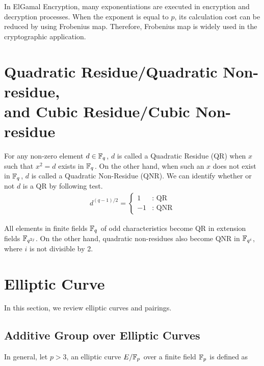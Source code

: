 In ElGamal Encryption, many exponentiations are executed in encryption and decryption processes.
When the exponent is equal to $p$, its calculation cost can be reduced by using Frobenius map.
Therefore, Frobenius map is widely used in the cryptographic application.     

\section{Quadratic Residue/Quadratic Non-residue, \\and Cubic Residue/Cubic Non-residue}
\label{sec:chap:fund:qrqnr}

For any non-zero element $d\in{\mathbb{F}}_{q^{}}$, $d$ is called a Quadratic Residue (QR) when $x$ such that $x^2=d$ exists in ${\mathbb{F}}_{q^{}}$.
On the other hand, when such an $x$ does not exist in ${\mathbb{F}}_{q^{}}$, $d$ is called a Quadratic Non-Residue (QNR).
We can identify whether or not $d$ is a QR by following test.
\begin{eqnarray}
d^{(q-1)/2} = \left\{
\begin{array}{ll}
1 & \mbox{: QR} \\
-1 & \mbox{: QNR} 
\end{array}
\right.
\end{eqnarray}

All elements in finite fields ${\mathbb{F}}_{q^{}}$ of odd characteristics become QR in extension fields ${\mathbb{F}}_{q^{2j}}$.
On the other hand, quadratic non-residues also become QNR in ${\mathbb{F}}_{q^{i}}$, where $i$ is not divisible by 2.

\section{Elliptic Curve}
\label{sec:chap:fund:ecc}
In this section, we review elliptic curves and pairings. 

\subsection{Additive Group over Elliptic Curves}

In general, let $p>3$, an elliptic curve $E/{\mathbb{F}}_{p^{}}$ over a finite field ${\mathbb{F}}_{p^{}}$ is defined as 

